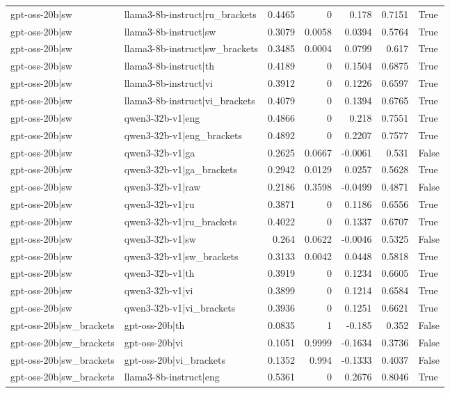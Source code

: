 \begin{table}
\begin{tabular}{l l r r r r l}
gpt-oss-20b|sw & llama3-8b-instruct|ru_brackets & 0.4465 & 0 & 0.178 & 0.7151 & True \\
gpt-oss-20b|sw & llama3-8b-instruct|sw & 0.3079 & 0.0058 & 0.0394 & 0.5764 & True \\
gpt-oss-20b|sw & llama3-8b-instruct|sw_brackets & 0.3485 & 0.0004 & 0.0799 & 0.617 & True \\
gpt-oss-20b|sw & llama3-8b-instruct|th & 0.4189 & 0 & 0.1504 & 0.6875 & True \\
gpt-oss-20b|sw & llama3-8b-instruct|vi & 0.3912 & 0 & 0.1226 & 0.6597 & True \\
gpt-oss-20b|sw & llama3-8b-instruct|vi_brackets & 0.4079 & 0 & 0.1394 & 0.6765 & True \\
gpt-oss-20b|sw & qwen3-32b-v1|eng & 0.4866 & 0 & 0.218 & 0.7551 & True \\
gpt-oss-20b|sw & qwen3-32b-v1|eng_brackets & 0.4892 & 0 & 0.2207 & 0.7577 & True \\
gpt-oss-20b|sw & qwen3-32b-v1|ga & 0.2625 & 0.0667 & -0.0061 & 0.531 & False \\
gpt-oss-20b|sw & qwen3-32b-v1|ga_brackets & 0.2942 & 0.0129 & 0.0257 & 0.5628 & True \\
gpt-oss-20b|sw & qwen3-32b-v1|raw & 0.2186 & 0.3598 & -0.0499 & 0.4871 & False \\
gpt-oss-20b|sw & qwen3-32b-v1|ru & 0.3871 & 0 & 0.1186 & 0.6556 & True \\
gpt-oss-20b|sw & qwen3-32b-v1|ru_brackets & 0.4022 & 0 & 0.1337 & 0.6707 & True \\
gpt-oss-20b|sw & qwen3-32b-v1|sw & 0.264 & 0.0622 & -0.0046 & 0.5325 & False \\
gpt-oss-20b|sw & qwen3-32b-v1|sw_brackets & 0.3133 & 0.0042 & 0.0448 & 0.5818 & True \\
gpt-oss-20b|sw & qwen3-32b-v1|th & 0.3919 & 0 & 0.1234 & 0.6605 & True \\
gpt-oss-20b|sw & qwen3-32b-v1|vi & 0.3899 & 0 & 0.1214 & 0.6584 & True \\
gpt-oss-20b|sw & qwen3-32b-v1|vi_brackets & 0.3936 & 0 & 0.1251 & 0.6621 & True \\
gpt-oss-20b|sw_brackets & gpt-oss-20b|th & 0.0835 & 1 & -0.185 & 0.352 & False \\
gpt-oss-20b|sw_brackets & gpt-oss-20b|vi & 0.1051 & 0.9999 & -0.1634 & 0.3736 & False \\
gpt-oss-20b|sw_brackets & gpt-oss-20b|vi_brackets & 0.1352 & 0.994 & -0.1333 & 0.4037 & False \\
gpt-oss-20b|sw_brackets & llama3-8b-instruct|eng & 0.5361 & 0 & 0.2676 & 0.8046 & True \\

\end{tabular}
\end{table}
